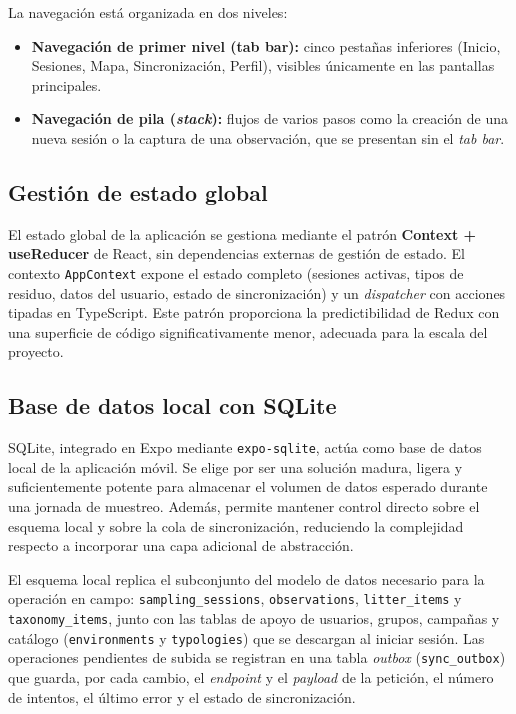 La navegación está organizada en dos niveles:

\begin{itemize}
  \item \textbf{Navegación de primer nivel (tab bar):} cinco pestañas inferiores
    (Inicio, Sesiones, Mapa, Sincronización, Perfil), visibles únicamente en las
    pantallas principales.
  \item \textbf{Navegación de pila (\textit{stack}):} flujos de varios pasos como la
    creación de una nueva sesión o la captura de una observación, que se presentan
    sin el \textit{tab bar}.
\end{itemize}

\subsection{Gestión de estado global}

El estado global de la aplicación se gestiona mediante el patrón
\textbf{Context + useReducer} de React, sin dependencias externas de gestión de
estado. El contexto \texttt{AppContext} expone el estado completo (sesiones activas,
tipos de residuo, datos del usuario, estado de sincronización) y un \textit{dispatcher}
con acciones tipadas en TypeScript. Este patrón proporciona la predictibilidad de
Redux con una superficie de código significativamente menor, adecuada para la escala
del proyecto.

\subsection{Base de datos local con SQLite}

SQLite, integrado en Expo mediante \texttt{expo-sqlite}, actúa como base de datos
local de la aplicación móvil. Se elige por ser una solución madura, ligera y
suficientemente potente para almacenar el volumen de datos esperado durante una
jornada de muestreo. Además, permite mantener control directo sobre el esquema local
y sobre la cola de sincronización, reduciendo la complejidad respecto a incorporar
una capa adicional de abstracción.

El esquema local replica el subconjunto del modelo de datos necesario para la
operación en campo: \texttt{sampling\_sessions}, \texttt{observations},
\texttt{litter\_items} y \texttt{taxonomy\_items}, junto con las tablas de apoyo de
usuarios, grupos, campañas y catálogo (\texttt{environments} y \texttt{typologies})
que se descargan al iniciar sesión. Las operaciones pendientes de subida se registran
en una tabla \textit{outbox} (\texttt{sync\_outbox}) que guarda, por cada cambio, el
\textit{endpoint} y el \textit{payload} de la petición, el número de intentos, el
último error y el estado de sincronización.

